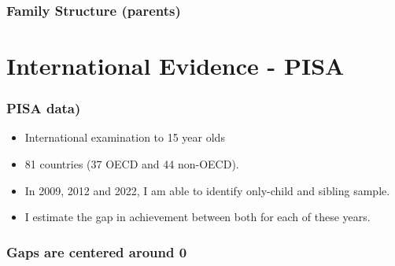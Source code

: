 \documentclass{beamer}
\begin{document}
\begin{frame}
    \label{update_scott}
    \frametitle{Family Structure (parents)}
 {
    }
\end{frame}

\section{International Evidence - PISA}
    \begin{frame}
         \label{update_scott}
            \frametitle{PISA data)}
        \begin{itemize}
            \item International examination to 15 year olds
            \item 81 countries (37 OECD and 44 non-OECD).
            \item In 2009, 2012 and 2022, I am able to identify only-child and sibling sample.
            \item I estimate the gap in achievement between both for each of these years.
        \end{itemize}
    \end{frame}

\begin{frame}
    \label{update_scott}
    \frametitle{Gaps are centered around 0}
        {
    }
\end{frame}
\end{document}
